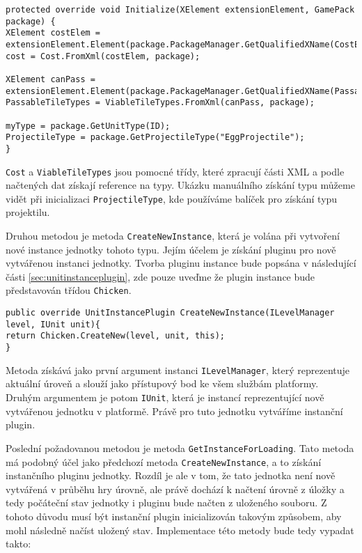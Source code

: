 \begin{lstlisting}
protected override void Initialize(XElement extensionElement, GamePack package) {
XElement costElem = extensionElement.Element(package.PackageManager.GetQualifiedXName(CostElement));
cost = Cost.FromXml(costElem, package);

XElement canPass =
extensionElement.Element(package.PackageManager.GetQualifiedXName(PassableTileTypesElement));
PassableTileTypes = ViableTileTypes.FromXml(canPass, package);

myType = package.GetUnitType(ID);
ProjectileType = package.GetProjectileType("EggProjectile");
}
\end{lstlisting}

\texttt{Cost} a \texttt{ViableTileTypes} jsou pomocné třídy, které zpracují části XML a podle načtených dat získají reference na typy. Ukázku manuálního získání typu můžeme vidět při inicializaci \texttt{ProjectileType}, kde používáme balíček pro získání typu projektilu.


Druhou metodou je metoda \texttt{CreateNewInstance}, která je volána při vytvoření nové instance jednotky tohoto typu. Jejím účelem je získání pluginu pro nově vytvářenou instanci jednotky. Tvorba pluginu instance bude popsána v následující části \ref{sec:unitinstanceplugin}, zde pouze uveďme že plugin instance bude představován třídou \texttt{Chicken}.
\begin{lstlisting}
public override UnitInstancePlugin CreateNewInstance(ILevelManager level, IUnit unit){
return Chicken.CreateNew(level, unit, this);
}
\end{lstlisting}
Metoda získává jako první argument instanci \texttt{ILevelManager}, který reprezentuje aktuální úroveň a slouží jako přístupový bod ke všem službám platformy. Druhým argumentem je potom \texttt{IUnit}, která je instancí reprezentující nově vytvářenou jednotku v platformě. Právě pro tuto jednotku vytváříme instanční plugin.


Poslední požadovanou metodou je metoda \texttt{GetInstanceForLoading}. Tato metoda má podobný účel jako předchozí metoda \texttt{CreateNewInstance}, a to získání instančního pluginu jednotky. Rozdíl je ale v tom, že tato jednotka není nově vytvářená v průběhu hry úrovně, ale právě dochází k načtení úrovně z úložky a tedy počáteční stav jednotky i pluginu bude načten z uloženého souboru. Z tohoto důvodu musí být instanční plugin inicializován takovým způsobem, aby mohl následně načíst uložený stav. Implementace této metody bude tedy vypadat takto:

